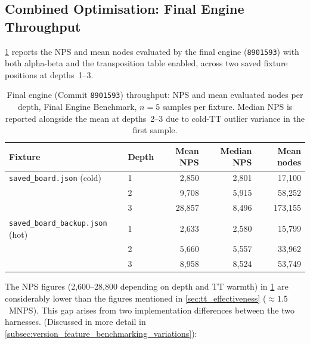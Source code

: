 \subsection{Combined Optimisation: Final Engine Throughput}
\label{sec:final_engine}

\cref{tab:version_bench} reports the NPS and mean nodes evaluated by the final
engine (\texttt{8901593}) with both alpha-beta and the transposition table enabled,
across two saved fixture positions at depths~1--3.

\begin{table}[ht]
  \centering
  \caption{Final engine (Commit \texttt{8901593}) throughput: NPS and mean evaluated nodes per
    depth, Final Engine Benchmark, $n = 5$ samples per fixture. Median NPS is reported alongside
    the mean at depths~2--3 due to cold-TT outlier variance in the first sample.}
  \label{tab:version_bench}
  \begin{tabular}{llrrr}
    \hline
    \textbf{Fixture}                         & \textbf{Depth} & \textbf{Mean NPS} & \textbf{Median NPS} & \textbf{Mean nodes} \\
    \hline
    \texttt{saved\_board.json} (cold)        & 1              & 2{,}850           & 2{,}801             & 17{,}100            \\
                                             & 2              & 9{,}708           & 5{,}915             & 58{,}252            \\
                                             & 3              & 28{,}857          & 8{,}496             & 173{,}155           \\
    \hline
    \texttt{saved\_board\_backup.json} (hot) & 1              & 2{,}633           & 2{,}580             & 15{,}799            \\
                                             & 2              & 5{,}660           & 5{,}557             & 33{,}962            \\
                                             & 3              & 8{,}958           & 8{,}524             & 53{,}749            \\
    \hline
  \end{tabular}
\end{table}


The NPS figures (2{,}600--28{,}800 depending on depth and TT warmth) in \cref{tab:version_bench}
are considerably lower than the figures mentioned in \cref{sec:tt_effectiveness} (${\approx}1.5$~MNPS). This
gap arises from two implementation differences between the two harnesses. (Discussed in more detail in \cref{subsec:version_feature_benchmarking_variations}):



